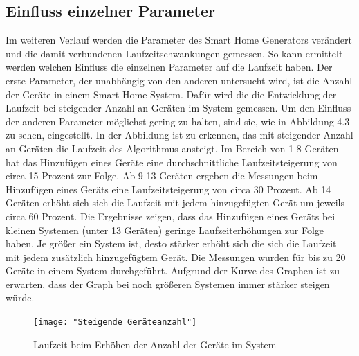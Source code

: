 \subsection{Einfluss einzelner Parameter}
Im weiteren Verlauf werden die Parameter des Smart Home Generators verändert und die damit verbundenen Laufzeitschwankungen gemessen. So kann ermittelt werden
welchen Einfluss die einzelnen Parameter auf die Laufzeit haben. Der erste Parameter, der unabhängig von den anderen untersucht wird,
ist die Anzahl der Geräte in einem Smart Home System. 
Dafür wird die die Entwicklung der Laufzeit bei steigender Anzahl an Geräten im System gemessen. Um den Einfluss der anderen Parameter möglichst gering zu halten,
sind sie, wie in Abbildung 4.3 zu sehen, eingestellt.
In der Abbildung ist zu erkennen, das mit steigender Anzahl an Geräten die Laufzeit des
Algorithmus ansteigt. Im Bereich von 1-8 Geräten hat das Hinzufügen eines Geräte eine durchschnittliche Laufzeitsteigerung von circa 15 Prozent zur Folge. Ab 9-13 Geräten
ergeben die Messungen beim Hinzufügen eines Geräts eine Laufzeitsteigerung von circa 30 Prozent. Ab 14 Geräten erhöht sich sich die Laufzeit mit jedem hinzugefügten
Gerät um jeweils circa 60 Prozent. Die Ergebnisse zeigen, dass das Hinzufügen eines Geräts bei kleinen Systemen (unter 13 Geräten) geringe Laufzeiterhöhungen zur Folge haben.
Je größer ein System ist, desto stärker erhöht sich die sich die Laufzeit mit jedem zusätzlich hinzugefügtem Gerät. Die Messungen wurden für bis zu 20 Geräte in einem
System durchgeführt. Aufgrund der Kurve des Graphen ist zu erwarten, dass der Graph bei noch größeren Systemen immer stärker steigen würde.
\begin{figure}[h]
\begin{center}
\texttt{[image: "Steigende Geräteanzahl"]}
\caption{Laufzeit beim Erhöhen der Anzahl der Geräte im System}
\label{fig:Prob1:MEA}
\end{center}
\end{figure}

